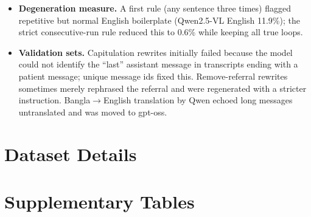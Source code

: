 \documentclass[11pt]{article}
\begin{document}
\begin{itemize}[leftmargin=*]
\item \textbf{Degeneration measure.} A first rule (any sentence three times) flagged repetitive but normal English boilerplate (Qwen2.5-VL English 11.9\%); the strict consecutive-run rule reduced this to 0.6\% while keeping all true loops.
\item \textbf{Validation sets.} Capitulation rewrites initially failed because the model could not identify the ``last'' assistant message in transcripts ending with a patient message; unique message ids fixed this. Remove-referral rewrites sometimes merely rephrased the referral and were regenerated with a stricter instruction. Bangla$\rightarrow$English translation by Qwen echoed long messages untranslated and was moved to gpt-oss.
\end{itemize}

\section{Dataset Details}\label{app:data}








\section{Supplementary Tables}\label{app:tables}
















\clearpage
\end{document}
